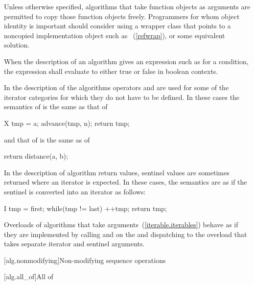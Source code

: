 \pnum
\enternote
Unless otherwise specified, algorithms that take function objects as arguments
are permitted to copy those function objects freely. Programmers for whom object
identity is important should consider using a wrapper class that points to a
noncopied implementation object such as ~(\ref{refwrap}), or some equivalent solution.
\exitnote

\begin{removedblock}
\pnum
When the description of an algorithm gives an expression such as
for a condition, the expression shall evaluate to
either true or false in boolean contexts.
\end{removedblock}

\pnum
In the description of the algorithms operators
\tcode{+}
and
\tcode{-}
are used for some of the iterator categories for which
they do not have to be defined.
In these cases the semantics of
is the same as that of

\begin{codeblock}
X tmp = a;
advance(tmp, n);
return tmp;
\end{codeblock}

and that of
is the same as of

\begin{codeblock}
return distance(a, b);
\end{codeblock}

\begin{addedblock}
\pnum
In the description of algorithm return values, sentinel values are sometimes
returned where an iterator is expected. In these cases, the semantics are as
if the sentinel is converted into an iterator as follows:

\begin{codeblock}
I tmp = first;
while(tmp != last)
  ++tmp;
return tmp;
\end{codeblock}

\pnum
Overloads of algorithms that take  arguments~(\ref{iterable.iterables})
behave as if they are implemented by calling  and  on
the  and dispatching to the overload that takes separate
iterator and sentinel arguments.
\end{addedblock}

[alg.nonmodifying]{Non-modifying sequence operations}

[alg.all_of]{All of}

